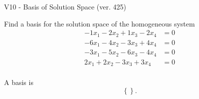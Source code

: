 \begin{exercise}
  \begin{exerciseTitle}V10 - Basis of Solution Space (ver. 425)\end{exerciseTitle}
  \begin{exerciseStatement}
    Find a basis for the solution space of the homogeneous system 
\begin{align*}
 -1 x_ 1 -2 x_ 2 + 1 x_ 3 -2 x_ 4 &= 0  \\ 
  -6 x_ 1 -4 x_ 2 -3 x_ 3 + 4 x_ 4 &= 0  \\ 
  -3 x_ 1 -5 x_ 2 -6 x_ 3 -4 x_ 4 &= 0  \\ 
  2 x_ 1 + 2 x_ 2 -3 x_ 3 + 3 x_ 4 &= 0  \\ 
 \end{align*}


 
  \end{exerciseStatement}

  \begin{exerciseAnswer}
   A basis is   
\[\left\{\right\}.\]

  


  \end{exerciseAnswer}
\end{exercise}